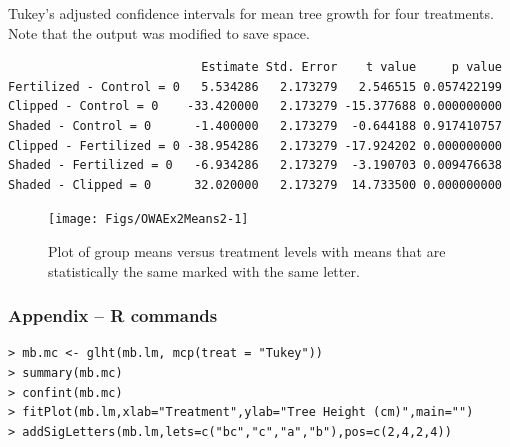 \documentclass[10pt,openany]{book}\usepackage[]{graphicx}\usepackage[]{color}
\makeatletter
\newenvironment{kframe}{%
 \def\at@end@of@kframe{}%
 \ifinner\ifhmode%
  \def\at@end@of@kframe{\end{minipage}}%
  \begin{minipage}{\columnwidth}%
 \fi\fi%
 \def\FrameCommand##1{\hskip\@totalleftmargin \hskip-\fboxsep
 \colorbox{shadecolor}{##1}\hskip-\fboxsep
     \hskip-\linewidth \hskip-\@totalleftmargin \hskip\columnwidth}%
 \MakeFramed {\advance\hsize-\width
   \@totalleftmargin\z@ \linewidth\hsize
   \@setminipage}}%
 {\par\unskip\endMakeFramed%
 \at@end@of@kframe}
\newenvironment{knitrout}{}{} %
\makeatother
\begin{document}
\begin{table}[h]
  \centering
  \caption{Tukey's adjusted confidence intervals for mean tree growth for four treatments. Note that the output was modified to save space.}\label{tab:OWAEx2HSD}
\begin{knitrout}
\color{fgcolor}\begin{kframe}
\begin{verbatim}
                           Estimate Std. Error    t value     p value
Fertilized - Control = 0   5.534286   2.173279   2.546515 0.057422199
Clipped - Control = 0    -33.420000   2.173279 -15.377688 0.000000000
Shaded - Control = 0      -1.400000   2.173279  -0.644188 0.917410757
Clipped - Fertilized = 0 -38.954286   2.173279 -17.924202 0.000000000
Shaded - Fertilized = 0   -6.934286   2.173279  -3.190703 0.009476638
Shaded - Clipped = 0      32.020000   2.173279  14.733500 0.000000000
\end{verbatim}
\end{kframe}
\end{knitrout}
\end{table}

\begin{knitrout}
\color{fgcolor}\begin{figure}[hbtp]

{\centering \texttt{[image: Figs/OWAEx2Means2-1]} 

}

\caption[Plot of group means versus treatment levels with means that are statistically the same marked with the same letter]{Plot of group means versus treatment levels with means that are statistically the same marked with the same letter.}\label{fig:OWAEx2Means2}
\end{figure}


\end{knitrout}

\subsubsection*{Appendix -- R commands}
\begin{Verbatim}[formatcom=\color{red},xleftmargin=5mm,commandchars=\\\{\}]
> mb.mc <- glht(mb.lm, mcp(treat = "Tukey"))
> summary(mb.mc)
> confint(mb.mc)
> fitPlot(mb.lm,xlab="Treatment",ylab="Tree Height (cm)",main="")
> addSigLetters(mb.lm,lets=c("bc","c","a","b"),pos=c(2,4,2,4))
\end{Verbatim}
\end{document}
